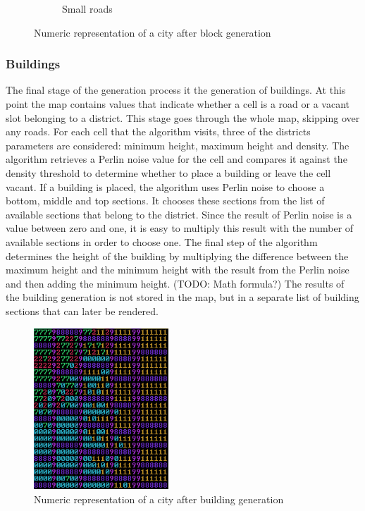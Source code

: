 \begin{figure}[h]
\begin{subfigure}{0.5\textwidth}
				\caption{Small roads}
				\label{fig:map-small-roads}
			\end{subfigure}
			\caption{Numeric representation of a city after block generation}
			\label{fig:map-main-and-small-roads}
		\end{figure}
		
		\subsubsection{Buildings}
		The final stage of the generation process it the generation of buildings. At this point the map contains values that indicate whether a cell is a road or a vacant slot belonging to a district. This stage goes through the whole map, skipping over any roads. For each cell that the algorithm visits, three of the districts parameters are considered: minimum height, maximum height and density. The algorithm retrieves a Perlin noise value for the cell and compares it against the density threshold to determine whether to place a building or leave the cell vacant. If a building is placed, the algorithm uses Perlin noise to choose a bottom, middle and top sections. It chooses these sections from the list of available sections that belong to the district. Since the result of Perlin noise is a value between zero and one, it is easy to multiply this result with the number of available sections in order to choose one. The final step of the algorithm determines the height of the building by multiplying the difference between the maximum height and the minimum height with the result from the Perlin noise and then adding the minimum height. (TODO: Math formula?) The results of the building generation is not stored in the map, but in a separate list of building sections that can later be rendered.
		
		\begin{figure}
			\centering
			\includegraphics[width=0.45\textwidth]{"Images/map grass colored"}
			\caption{Numeric representation of a city after building generation}
			\label{fig:map-grass}
		\end{figure}

